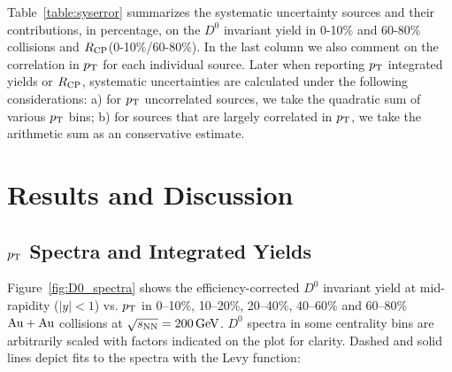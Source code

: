 \documentclass[%
 reprint,	
 amsmath,amssymb,
 aps,
 prc,
]{revtex4-1}
\begin{document}
Table~\ref{table:syserror} summarizes the systematic uncertainty sources and their contributions, in percentage, on the $D^0$ invariant yield in 0-10\% and 60-80\% collisions and $R_{\rm CP}$(0-10\%/60-80\%). In the last column we also comment on the correlation in $p_{\rm T}$ for each individual source. Later when reporting $p_{\rm T}$ integrated yields or $R_{\rm CP}$, systematic uncertainties are calculated under the following considerations: a) for $p_{\rm T}$ uncorrelated sources, we take the quadratic sum of various $p_{\rm T}$ bins; b) for sources that are largely correlated in $p_{\rm T}$, we take the arithmetic sum as an conservative estimate.



\section{\label{result}Results and Discussion}

\subsection{\label{result:pt}$p_{\rm T}$ Spectra and Integrated Yields}
Figure~\ref{fig:D0_spectra} shows the efficiency-corrected $D^0$ invariant yield at mid-rapidity ($|y|<1$) vs. $p_{\rm T}$ in 0--10\%, 10--20\%, 20--40\%, 40--60\% and 60--80\% ${\rm{Au + Au}}$ collisions at ${\sqrt{s_{\rm NN}} = \rm{200\,GeV}}$. $D^0$ spectra in some centrality bins are arbitrarily scaled with factors indicated on the plot for clarity. Dashed and solid lines depict fits to the spectra with the Levy function:
\end{document}
